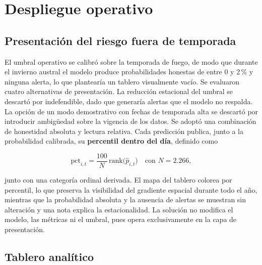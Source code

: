 \documentclass[11pt,a4paper]{article}
\begin{document}
\section{Despliegue operativo}
\label{sec:produccion}

\subsection{Presentación del riesgo fuera de temporada}
\label{sec:invierno}

El umbral operativo se calibró sobre la temporada de fuego, de modo que
durante el invierno austral el modelo produce probabilidades honestas de
entre 0 y 2\,\% y ninguna alerta, lo que plantearía un tablero visualmente
vacío. Se evaluaron cuatro alternativas de presentación. La reducción
estacional del umbral se descartó por indefendible, dado que generaría
alertas que el modelo no respalda. La opción de un modo demostrativo con
fechas de temporada alta se descartó por introducir ambigüedad sobre la
vigencia de los datos. Se adoptó una combinación de honestidad absoluta y
lectura relativa. Cada predicción publica, junto a la probabilidad
calibrada, su \textbf{percentil dentro del día}, definido como

\begin{equation}
\mathrm{pct}_{i,t} = \frac{100}{N}\,
\mathrm{rank}\bigl(\hat{p}_{i,t}\bigr) \quad\text{con } N = 2.266,
\label{eq:percentil}
\end{equation}

\noindent junto con una categoría ordinal derivada. El mapa del tablero
colorea por percentil, lo que preserva la visibilidad del gradiente
espacial durante todo el año, mientras que la probabilidad absoluta y la
ausencia de alertas se muestran sin alteración y una nota explica la
estacionalidad. La solución no modifica el modelo, las métricas ni el
umbral, pues opera exclusivamente en la capa de presentación.

\subsection{Tablero analítico}
\label{sec:tablero}
\end{document}
